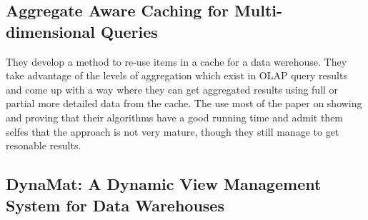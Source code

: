 \cite{pcsqm}


\subsection{Aggregate Aware Caching for Multi-dimensional Queries}

They develop a method to re-use items in a cache for a data werehouse. They take advantage of the levels of aggregation which exist in OLAP query results and come up with a way where they can get aggregated results using full or partial more detailed data from the cache. The use most of the paper on showing and proving that their algorithms have a good running time and admit them selfes that the approach is not very mature, though they still manage to get resonable results.
\cite{lncs2000}



\subsection{DynaMat: A Dynamic View Management System for Data Warehouses}

